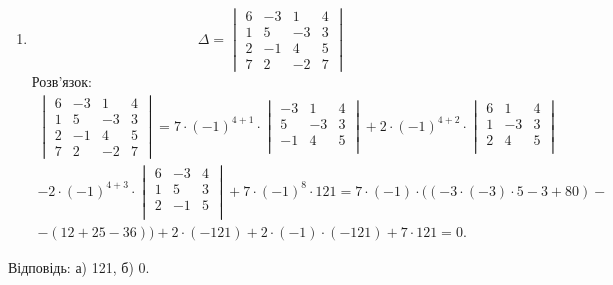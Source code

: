 \documentclass{article}
\begin{document}
{\begin{enumerate}
\begin{enumerate}
Розв'язок:
		\begin{equation}
			\begin{vmatrix}
				6&-3&1\\
				1&5&-3\\
				2&-1&4
			\end{vmatrix} = 120-1+18-10-18+12=121.
		\end{equation}
	\item
		\begin{equation}
			\Delta = \begin{vmatrix}
				6&-3&1&4\\
				1&5&-3&3\\
				2&-1&4&5\\
				7&2&-2&7
			\end{vmatrix}
		\end{equation}
Розв'язок:
		\begin{equation}
			\begin{split}
			\begin{vmatrix}
				6&-3&1&4\\
				1&5&-3&3\\
				2&-1&4&5\\
				7&2&-2&7
			\end{vmatrix}= 7 \cdot (-1)^{4+1} \cdot
			\begin{vmatrix}
				-3&1&4\\
				5&-3&3\\
				-1&4&5\\
			\end{vmatrix} + 2 \cdot (-1)^{4+2} \cdot
			\begin{vmatrix}
				6&1&4\\
				1&-3&3\\
				2&4&5\\
			\end{vmatrix} \\ -2 \cdot (-1)^{4+3} \cdot
			\begin{vmatrix}
				6&-3&4\\
				1&5&3\\
				2&-1&5\\
			\end{vmatrix} + 7 \cdot (-1)^8 \cdot 121 = 7 \cdot (-1) \cdot ((-3 \cdot (-3) \cdot 5-3+80) - \\ - (12+25-36)) + 2 \cdot (-121) + 2 \cdot (-1) \cdot (-121) + 7 \cdot 121 = 0.
			\end{split}
		\end{equation}
\end{enumerate}
Відповідь: а) 121, б) 0.

\end{enumerate}}
\end{document}
